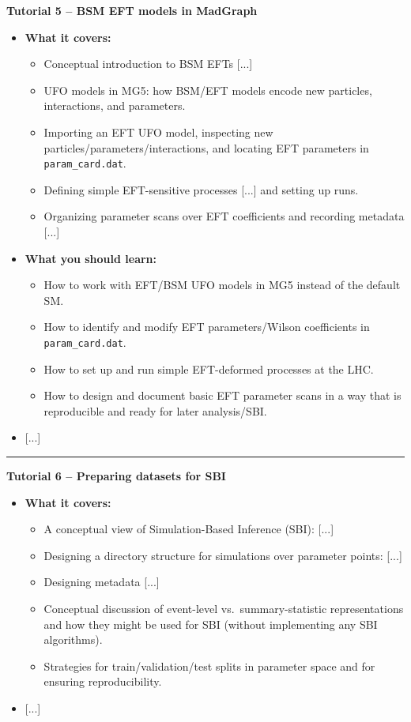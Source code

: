 \documentclass[submission, Phys]{SciPost}
\begin{document}
\begin{promptblock}[\ma (shortened)]
\textbf{Tutorial 5 – BSM EFT models in MadGraph}
\begin{itemize}
\item \textbf{What it covers:}
\begin{itemize}
\item Conceptual introduction to BSM EFTs [...]
\item UFO models in MG5: how BSM/EFT models encode new particles, interactions, and parameters.
\item Importing an EFT UFO model, inspecting new particles/parameters/interactions, and locating EFT parameters in \lstinline|param_card.dat|.
\item Defining simple EFT-sensitive processes [...] and setting up runs.
\item Organizing parameter scans over EFT coefficients and recording metadata [...]
\end{itemize}

\item \textbf{What you should learn:}
\begin{itemize}
\item How to work with EFT/BSM UFO models in MG5 instead of the default SM.
\item How to identify and modify EFT parameters/Wilson coefficients in \lstinline|param_card.dat|.
\item How to set up and run simple EFT-deformed processes at the LHC.
\item How to design and document basic EFT parameter scans in a way that is reproducible and ready for later analysis/SBI.
\end{itemize}
\item {[...]}
\end{itemize}

\vspace{1em}
\hrule
\vspace{1em}

\textbf{Tutorial 6 – Preparing datasets for SBI}
\begin{itemize}
\item \textbf{What it covers:}
\begin{itemize}
\item A conceptual view of Simulation-Based Inference (SBI): [...]
\item Designing a directory structure for simulations over parameter points: [...]
\item Designing metadata [...]
\item Conceptual discussion of event-level vs.\ summary-statistic representations and how they might be used for SBI (without implementing any SBI algorithms).
\item Strategies for train/validation/test splits in parameter space and for ensuring reproducibility.
\end{itemize}
\item {[...]}


\end{itemize}
\end{promptblock}
\end{document}
